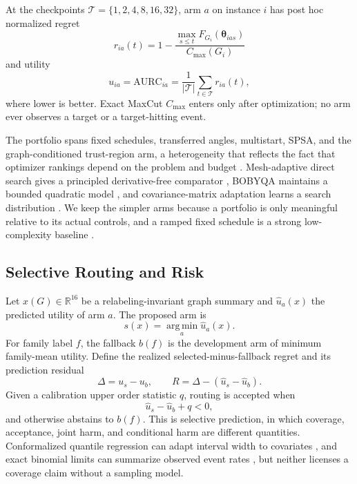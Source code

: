 \documentclass[10pt,twocolumn]{article}
\newcommand{\R}{\mathbb{R}}
\newcommand{\AURC}{\mathrm{AURC}}
\newcommand{\argminop}{\operatorname*{arg\,min}}
\begin{document}
At the checkpoints $\mathcal T=\{1,2,4,8,16,32\}$, arm $a$ on instance $i$ has
post hoc normalized regret
\begin{equation}
 r_{ia}(t)=1-
 \frac{\max_{s\le t}F_{G_i}(\bm\theta_{ias})}{C_{\max}(G_i)}
 \label{eq:regret}
\end{equation}
and utility
\begin{equation}
 u_{ia}=\AURC_{ia}=
 \frac{1}{|\mathcal T|}\sum_{t\in\mathcal T}r_{ia}(t),
 \label{eq:aurc}
\end{equation}
where lower is better.  Exact MaxCut $C_{\max}$ enters only after optimization;
no arm ever observes a target or a target-hitting event.

The portfolio spans fixed schedules, transferred angles, multistart, SPSA, and
the graph-conditioned trust-region arm, a heterogeneity that reflects the fact
that optimizer rankings depend on the problem and budget
\citep{bonet2023performance}.  Mesh-adaptive direct search gives a principled
derivative-free comparator \citep{audet2006mesh}, BOBYQA maintains a bounded
quadratic model \citep{powell2009bobyqa}, and covariance-matrix adaptation learns
a search distribution \citep{hansen2001cma}.  We keep the simpler arms because a
portfolio is only meaningful relative to its actual controls, and a ramped
fixed schedule is a strong low-complexity baseline \citep{montanez2025ramp}.

\subsection{Selective Routing and Risk}

Let $x(G)\in\R^{16}$ be a relabeling-invariant graph summary and
$\widehat u_a(x)$ the predicted utility of arm $a$.  The proposed arm is
\begin{equation}
 s(x)=\argminop_a\widehat u_a(x).
 \label{eq:selected}
\end{equation}
For family label $f$, the fallback $b(f)$ is the development arm of minimum
family-mean utility.  Define the realized selected-minus-fallback regret and its
prediction residual
\begin{equation}
 \Delta=u_s-u_b,
 \qquad
 R=\Delta-(\widehat u_s-\widehat u_b).
 \label{eq:residual}
\end{equation}
Given a calibration upper order statistic $q$, routing is accepted when
\begin{equation}
 \widehat u_s-\widehat u_b+q<0,
 \label{eq:gate}
\end{equation}
and otherwise abstains to $b(f)$.  This is selective prediction, in which
coverage, acceptance, joint harm, and conditional harm are different quantities.
Conformalized quantile regression can adapt interval width to covariates
\citep{romano2019cqr}, and exact binomial limits can summarize observed event
rates \citep{clopper1934fiducial}, but neither licenses a coverage claim without
a sampling model.
\end{document}
